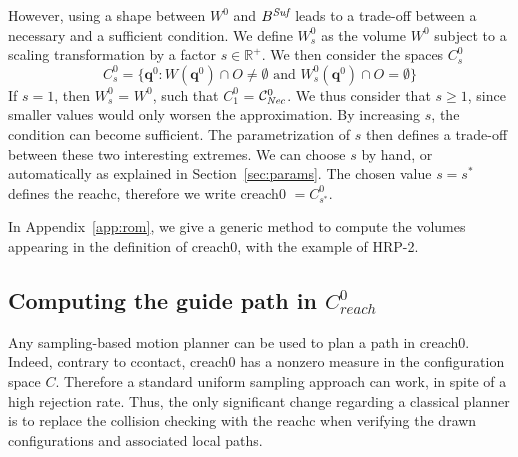 
However, using a shape between $W^0$ and $B^{\textrm{\it Suf}}$ leads to a trade-off between a necessary and a sufficient condition. We define $W^0_s$ as the volume $W^0$ subject to a scaling transformation by a factor $s \in \mathbb{R}^+$.
%
We then consider the spaces $C_{s}^0$
 \begin{equation}
C^0_s = \{ \mathbf{q}^0 : W(\mathbf{q}^{0}) \cap O \neq \emptyset \text{ and } W^0_s(\mathbf{q}^{0}) \cap O = \emptyset \} %
\end{equation}
%
If $s=1$, then $W^0_s$ = $W^0$, such that $C_1^0$ = $\mathcal{C}^0_{\textrm{\it Nec}}$. We thus consider that $s \geq 1$, since smaller values would only worsen the approximation.
By increasing $s$, the condition can become sufficient.
The parametrization of $s$ then defines a trade-off between these two interesting extremes. 
We can choose $s$ by hand, or automatically as explained in Section~\ref{sec:params}.
The chosen value $s=s^*$ defines the \gls{reachc}, therefore we write \gls{creach0} $= C^0_{s^*}$.

In Appendix~\ref{app:rom}, we give a generic method to compute the volumes appearing in the definition of \gls{creach0}, with the example of HRP-2.

\subsection{Computing the guide path in $C_{reach}^0$}
Any sampling-based motion planner can be used to plan a path in \gls{creach0}. 
Indeed, contrary to \gls{ccontact}, \gls{creach0} has a nonzero measure in the configuration space $C$. Therefore a standard uniform sampling approach
can work, in spite of a high rejection rate. 
Thus, the only significant change regarding a classical planner is to replace the collision checking with the \gls{reachc} when verifying
the drawn configurations and associated local paths.

